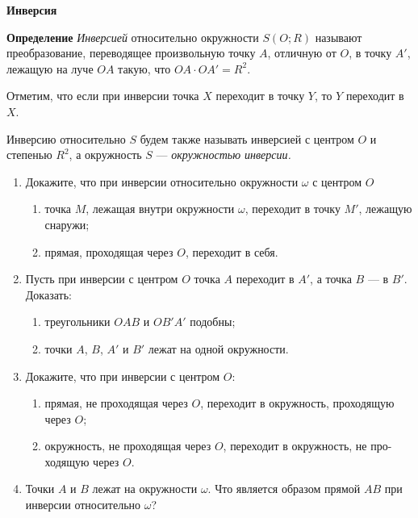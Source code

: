 \documentclass{article}
\begin{document}
\large

\begin{center}
	\textbf{Инверсия}
\end{center}

\textbf{Определение} \textit{Инверсией} относительно окружности $S(O; R)$ называют преобразование, переводящее произвольную точку $A$, отличную от $O$, в точку $A'$, лежащую на луче $OA$ такую, что $OA \cdot OA' = R^2$.

Отметим, что если при инверсии точка $X$ переходит в точку $Y$, то $Y$ переходит в $X$.

Инверсию относительно $S$ будем также называть инверсией с центром $O$ и степенью $R^2$, а окружность $S$ — \textit{окружностью инверсии.}

\begin{enumerate}[label*=\protect\fbox{\arabic{enumi}}]

\item Докажите, что при инверсии относительно окружности $\omega$ с центром $O$
\begin{enumerate}[label=\alph*)]
\item точка $M$, лежащая внутри окружности $\omega$, переходит в точку $M'$, лежащую снаружи;
\item прямая, проходящая через $O$, переходит в себя.
\end{enumerate}

\item Пусть при инверсии с центром $O$ точка $A$ переходит в $A'$, а точка $B$ — в $B'$. Доказать:
\begin{enumerate}[label=\alph*)]
\item треугольники $OAB$ и $OB'A'$ подобны;
\item точки $A$, $B$, $A'$ и $B'$ лежат на одной окружности.
\end{enumerate}

\item Докажите, что при инверсии с центром $O$:
\begin{enumerate}[label=\alph*)]
\item прямая, не проходящая через $O$, переходит в окружность, проходящую через $O$;
\item окружность, не проходящая через $O$, переходит в окружность, не про- ходящую через $O$.
\end{enumerate}

\item Точки $A$ и $B$ лежат на окружности $\omega$. Что является образом прямой $AB$ при инверсии относительно $\omega$?


\end{enumerate}
\end{document}
